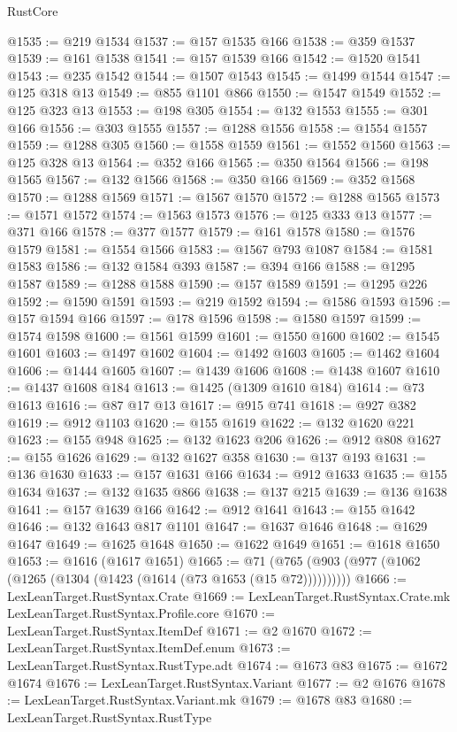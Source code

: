 \begin{lexlean}{RustCore}
\begin{coremodule}
@1535 := @219 @1534
@1537 := @157 @1535 @166
@1538 := @359 @1537
@1539 := @161 @1538
@1541 := @157 @1539 @166
@1542 := @1520 @1541
@1543 := @235 @1542
@1544 := @1507 @1543
@1545 := @1499 @1544
@1547 := @125 @318 @13
@1549 := @855 @1101 @866
@1550 := @1547 @1549
@1552 := @125 @323 @13
@1553 := @198 @305
@1554 := @132 @1553
@1555 := @301 @166
@1556 := @303 @1555
@1557 := @1288 @1556
@1558 := @1554 @1557
@1559 := @1288 @305
@1560 := @1558 @1559
@1561 := @1552 @1560
@1563 := @125 @328 @13
@1564 := @352 @166
@1565 := @350 @1564
@1566 := @198 @1565
@1567 := @132 @1566
@1568 := @350 @166
@1569 := @352 @1568
@1570 := @1288 @1569
@1571 := @1567 @1570
@1572 := @1288 @1565
@1573 := @1571 @1572
@1574 := @1563 @1573
@1576 := @125 @333 @13
@1577 := @371 @166
@1578 := @377 @1577
@1579 := @161 @1578
@1580 := @1576 @1579
@1581 := @1554 @1566
@1583 := @1567 @793 @1087
@1584 := @1581 @1583
@1586 := @132 @1584 @393
@1587 := @394 @166
@1588 := @1295 @1587
@1589 := @1288 @1588
@1590 := @157 @1589
@1591 := @1295 @226
@1592 := @1590 @1591
@1593 := @219 @1592
@1594 := @1586 @1593
@1596 := @157 @1594 @166
@1597 := @178 @1596
@1598 := @1580 @1597
@1599 := @1574 @1598
@1600 := @1561 @1599
@1601 := @1550 @1600
@1602 := @1545 @1601
@1603 := @1497 @1602
@1604 := @1492 @1603
@1605 := @1462 @1604
@1606 := @1444 @1605
@1607 := @1439 @1606
@1608 := @1438 @1607
@1610 := @1437 @1608 @184
@1613 := @1425 (@1309 @1610 @184)
@1614 := @73 @1613
@1616 := @87 @17 @13
@1617 := @915 @741
@1618 := @927 @382
@1619 := @912 @1103
@1620 := @155 @1619
@1622 := @132 @1620 @221
@1623 := @155 @948
@1625 := @132 @1623 @206
@1626 := @912 @808
@1627 := @155 @1626
@1629 := @132 @1627 @358
@1630 := @137 @193
@1631 := @136 @1630
@1633 := @157 @1631 @166
@1634 := @912 @1633
@1635 := @155 @1634
@1637 := @132 @1635 @866
@1638 := @137 @215
@1639 := @136 @1638
@1641 := @157 @1639 @166
@1642 := @912 @1641
@1643 := @155 @1642
@1646 := @132 @1643 @817 @1101
@1647 := @1637 @1646
@1648 := @1629 @1647
@1649 := @1625 @1648
@1650 := @1622 @1649
@1651 := @1618 @1650
@1653 := @1616 (@1617 @1651)
@1665 := @71 (@765 (@903 (@977 (@1062 (@1265 (@1304 (@1423 (@1614 (@73 @1653 (@15 @72))))))))))
@1666 := LexLeanTarget.RustSyntax.Crate
@1669 := LexLeanTarget.RustSyntax.Crate.mk LexLeanTarget.RustSyntax.Profile.core
@1670 := LexLeanTarget.RustSyntax.ItemDef
@1671 := @2 @1670
@1672 := LexLeanTarget.RustSyntax.ItemDef.enum
@1673 := LexLeanTarget.RustSyntax.RustType.adt
@1674 := @1673 @83
@1675 := @1672 @1674
@1676 := LexLeanTarget.RustSyntax.Variant
@1677 := @2 @1676
@1678 := LexLeanTarget.RustSyntax.Variant.mk
@1679 := @1678 @83
@1680 := LexLeanTarget.RustSyntax.RustType

\end{coremodule}
\end{lexlean}

